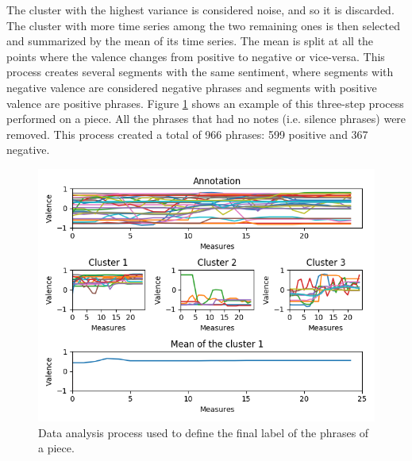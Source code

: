 The cluster with the highest variance is considered noise, and so it is discarded. The cluster with more time series among the two remaining ones is then selected and summarized by the mean of its time series. The mean is split at all the points where the valence changes from positive to negative or vice-versa. This process creates several segments with the same sentiment, where segments with negative valence are considered negative phrases and segments with positive valence are positive phrases. Figure \ref{fig:clustering} shows an example of this three-step process performed on a piece. All the phrases that had no notes (i.e. silence phrases) were removed. This process created a total of 966 phrases: 599 positive and 367 negative.

\begin{figure}
 \centering
 \includegraphics[width=\columnwidth]{imgs/ismir19/clustering.png}
 \caption{Data analysis process used to define the final label of the phrases of a piece. }
 \label{fig:clustering}
\end{figure}

%


